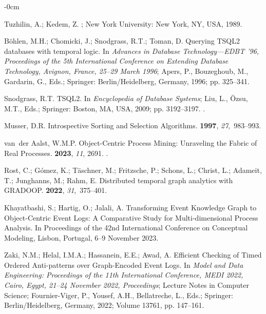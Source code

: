 \documentclass[information,article,accept,pdftex,oneauthor]{Definitions/mdpi}
\begin{document}
\begin{adjustwidth}{-\extralength}{0cm}
\begin{thebibliography}{999}
Tuzhilin, A.; Kedem, Z.
; New York University:  {New York, NY, USA}, 1989.

B{\"o}hlen, M.H.; Chomicki, J.; Snodgrass, R.T.; Toman, D.
\newblock Querying TSQL2 databases with temporal logic.
\newblock In \emph{Advances in Database Technology---EDBT '96, Proceedings of the {5th International Conference on Extending Database Technology, Avignon, France,  25--29 March 1996}};
  Apers, P., Bouzeghoub, M., Gardarin, G., Eds.; Springer: Berlin/Heidelberg, Germany, 1996; pp.
  325--341.

Snodgrass, R.T. TSQL2.
\newblock In {\em Encyclopedia of Database Systems}; Liu, L., {\"O}zsu, M.T.,
  Eds.; Springer: Boston, MA, USA, 2009; pp. 3192--3197.
.

Musser, D.R.
\newblock Introspective Sorting and Selection Algorithms.
 {\bf 1997}, {\em 27},~983--993.

van~der Aalst, W.M.P.
\newblock Object-Centric Process Mining: Unraveling the Fabric of Real
  Processes.
 {\bf 2023}, {\em 11}, {2691}.
.

Rost, C.; G{\'{o}}mez, K.; T{\"{a}}schner, M.; Fritzsche, P.; Schons, L.;
  Christ, L.; Adameit, T.; Junghanns, M.; Rahm, E.
\newblock Distributed temporal graph analytics with {GRADOOP}.
 {\bf 2022}, {\em 31},~375--401.

Khayatbashi, S.; Hartig, O.; Jalali, A.
\newblock Transforming Event Knowledge Graph to Object-Centric Event Logs: A
  Comparative Study for Multi-dimensional Process Analysis.
\newblock In Proceedings of the 42nd International Conference on Conceptual
  Modeling, {Lisbon, Portugal, 6–9 November} 2023.

Zaki, N.M.; Helal, I.M.A.; Hassanein, E.E.; Awad, A.
\newblock Efficient Checking of Timed Ordered Anti-patterns over Graph-Encoded
  Event Logs.
\newblock In \emph{Model and Data Engineering: Proceedings of the 11th International
  Conference, {MEDI} 2022, Cairo, Egypt, 21--24 November 2022, Proceedings}; {Lecture Notes in Computer Science}; 
  Fournier{-}Viger, P., Yousef, A.H., Bellatreche, L., Eds.; Springer:  {Berlin/Heidelberg, Germany,}   2022;
  Volume 13761, pp. 147--161.


\end{thebibliography}
\end{adjustwidth}
\end{document}
